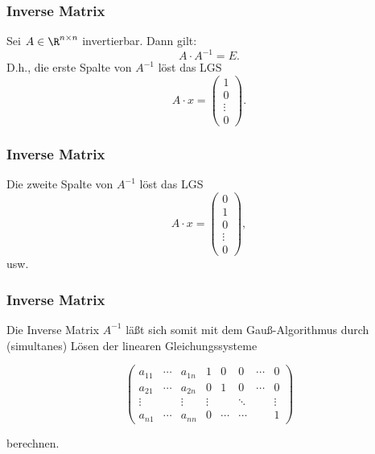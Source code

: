 %
\begin{frame}\frametitle{Inverse Matrix}
	
	Sei $A\in\R^{n\times n}$ invertierbar. Dann gilt:
	$$
		A\cdot A^{-1} = E.
	$$
	D.h., die erste Spalte von $A^{-1}$ löst das LGS
	$$
		A\cdot x 
		= 
		\begin{pmatrix}
			1 \\ 0 \\ \vdots \\ 0
		\end{pmatrix}.
	$$

\end{frame}
%
%
\begin{frame}\frametitle{Inverse Matrix}
	
	Die zweite Spalte von $A^{-1}$ löst das LGS
	$$
		A\cdot x 
		= 
		\begin{pmatrix}
			0 \\ 1 \\0\\ \vdots \\ 0
		\end{pmatrix},
	$$
	usw.

\end{frame}
%
%
\begin{frame}\frametitle{Inverse Matrix}

	Die Inverse Matrix $A^{-1}$ lä{\ss}t sich somit mit dem Gau{\ss}-Algorithmus durch (simultanes) Lösen der linearen Gleichungssysteme
	
	$$
		\left(
		\begin{array}{ccc|ccccc}
			a_{11}	&\cdots	&a_{1n}	&1		&0		&0		&\cdots	&0 \\
			a_{21} 	&\cdots	&a_{2n}	&0		&1		&0		&\cdots	&0\\
			\vdots 	&            	&\vdots	&\vdots	& 		&\ddots	&		&\vdots \\
			a_{n1} 	&\cdots 	&a_{nn} 	&0         	&\cdots 	&\cdots	& 		& 1   
		\end{array}
		\right)
	$$
	
	berechnen.
	
\end{frame}
%

